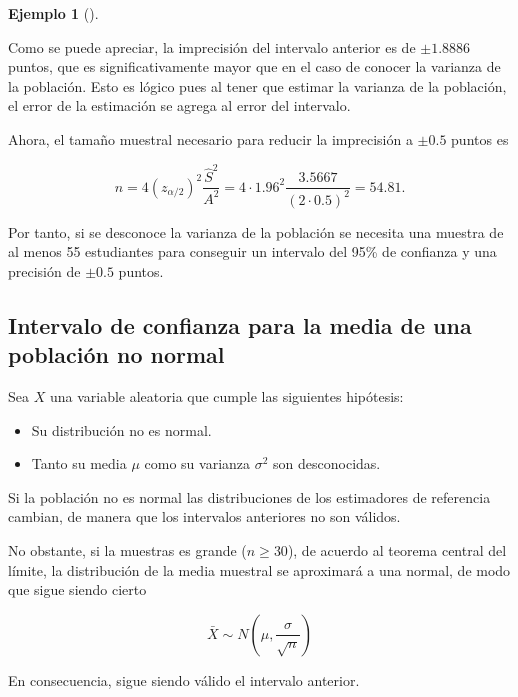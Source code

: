 \documentclass[
  a4paper,
]{scrreport}
\providecommand{\tightlist}{%
  \setlength{\itemsep}{0pt}\setlength{\parskip}{0pt}}\usepackage{longtable,booktabs,array}
\theoremstyle{plain}
\theoremstyle{definition}
\newtheorem{example}{Ejemplo}[chapter]
\theoremstyle{definition}
\theoremstyle{remark}
\begin{document}
\begin{example}[]\protect\hypertarget{exm-tamaño-muestral-ntervalo-confianza-media-normal-varianza-desconocida}{}\label{exm-tamaño-muestral-ntervalo-confianza-media-normal-varianza-desconocida}

Como se puede apreciar, la imprecisión del intervalo anterior es de
\(\pm 1.8886\) puntos, que es significativamente mayor que en el caso de
conocer la varianza de la población. Esto es lógico pues al tener que
estimar la varianza de la población, el error de la estimación se agrega
al error del intervalo.

Ahora, el tamaño muestral necesario para reducir la imprecisión a
\(\pm 0.5\) puntos es

\[
n = 4 (z_{\alpha/2})^2\frac{\hat{S}^2}{A^2} = 4\cdot 1.96^2\frac{3.5667}{(2\cdot 0.5)^2} = 54.81.
\]

Por tanto, si se desconoce la varianza de la población se necesita una
muestra de al menos 55 estudiantes para conseguir un intervalo del 95\%
de confianza y una precisión de \(\pm 0.5\) puntos.

\end{example}

\subsection{Intervalo de confianza para la media de una población no
normal}\label{intervalo-de-confianza-para-la-media-de-una-poblaciuxf3n-no-normal}

Sea \(X\) una variable aleatoria que cumple las siguientes hipótesis:

\begin{itemize}
\tightlist
\item
  Su distribución no es normal.
\item
  Tanto su media \(\mu\) como su varianza \(\sigma^2\) son desconocidas.
\end{itemize}

Si la población no es normal las distribuciones de los estimadores de
referencia cambian, de manera que los intervalos anteriores no son
válidos.

No obstante, si la muestras es grande (\(n\geq 30\)), de acuerdo al
teorema central del límite, la distribución de la media muestral se
aproximará a una normal, de modo que sigue siendo cierto

\[
\bar X \sim N\left(\mu,\frac{\sigma}{\sqrt{n}}\right)
\]

En consecuencia, sigue siendo válido el intervalo anterior.
\end{document}
